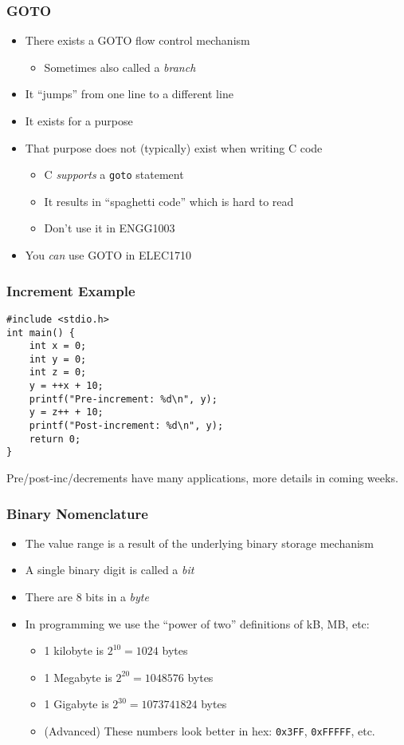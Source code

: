 \documentclass[14pt]{beamer}
\begin{document}
\begin{frame}
\frametitle{GOTO}
\begin{itemize}
\item There exists a GOTO flow control mechanism
	\begin{itemize}
		\item Sometimes also called a \textit{branch}
	\end{itemize}
\item It ``jumps'' from one line to a different line
\item It exists for a purpose
\item That purpose does not (typically) exist when writing C code
	\begin{itemize}
		\item C \textit{supports} a \texttt{goto} statement
		\item It results in ``spaghetti code'' which is hard to read
		\item Don't use it in ENGG1003
	\end{itemize}
\item You \textit{can} use GOTO in ELEC1710
\end{itemize}
\end{frame}

\begin{frame}[fragile]
\frametitle{Increment Example}
\begin{lstlisting}[style=CStyle,caption=\texttt{increment.c}]
#include <stdio.h>
int main() {
	int x = 0;
	int y = 0;
	int z = 0;
	y = ++x + 10;
	printf("Pre-increment: %d\n", y);
	y = z++ + 10;
	printf("Post-increment: %d\n", y);
	return 0;
}
\end{lstlisting}
Pre/post-inc/decrements have many applications, more details in coming weeks.
\end{frame}

\begin{frame}
\frametitle{Binary Nomenclature}
\begin{itemize}
\item The value range is a result of the underlying binary storage mechanism
\item A single binary digit is called a \textit{bit}
\item There are 8 bits in a \textit{byte}
\item In programming we use the ``power of two'' definitions of kB, MB, etc:
	\begin{itemize}
		\item 1 kilobyte is $2^{10} = 1024$ bytes
		\item 1 Megabyte is $2^{20} = 1048576$ bytes
		\item 1 Gigabyte is $2^{30} = 1073741824$ bytes
		\item (Advanced) These numbers look better in hex: \texttt{0x3FF}, \texttt{0xFFFFF}, etc.
	\end{itemize}
\end{itemize}
\end{frame}
\end{document}
